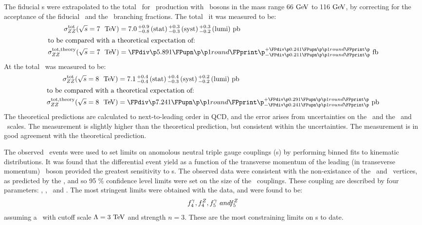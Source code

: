 The fiducial \cx s were extrapolated to the total \cx\ for \ZZ\
production with \Z\ bosons in the mass range 66$\GeV$ to 116$\GeV$, by
correcting for the acceptance of the fiducial \phasespace\ and the \Zll\
branching fractions. The total \cx\ it  was measured to be:
\begin{align}
\sigmaTotZZ(\sqrtseq{7}) &= \ZZSevenTeVTotalCrossSection \\
\intertext{to be compared with a theoretical expectation of:}
\sigmaTotTheoryZZ(\sqrtseq{7}) &= \ZZSevenTeVTheoryTotalCrossSection
\end{align}
At \sqrtseq{8} the total \cx\ was measured to be:
\begin{align}
\sigmaTotZZ(\sqrtseq{8}) &= \ZZEightTeVTotalCrossSection \\
\intertext{to be compared with a theoretical expectation of:}
\sigmaTotTheoryZZ(\sqrtseq{8}) &= \ZZEightTeVTheoryTotalCrossSection
\end{align}
The theoretical predictions are calculated to next-to-leading order in QCD, and
the error arises from uncertainties on the \PDF\ and the \fact\ and \renorm\
scales. The  measurement is slightly higher than the theoretical prediction,
but consistent within the uncertainties. The \sqrtseq{8} measurement is in good
agreement with the theoretical prediction. 

The observed \ZZllll\ events were used to set limits on anomolous neutral triple
gauge couplings (\nTGC s) by performing binned fits to kinematic distributions.
It was found that the differential event yield as a function of the transverse
momentum of the leading (in transeverse momentum) \Z\ boson provided the
greatest sensitivity to \TGC s. The observed data were consistent with the non-existance of the
\ZZZ\ and \ZZg\ vertices, as predicted by the \sm, and so 95 \% confidence level
limits were set on the size of the \TGC\ couplings. These coupling are
described by four parameters: \ffourg, \ffourZ, \ffiveg\ and \ffiveZ. The
most stringent limits were obtained with the \sqrtseq{8} data, and were found to
be:
\begin{align}
f_{4}^{\gamma}, f_{4}^{Z}, f_{5}^{\gamma}\ and f_{5}^{Z}
\end{align}
assuming a \formfactor\ with cutoff scale $\Lambda=3 \tev$ and strength $n=3$.
These are the most constraining limits on \TGC s to date.
